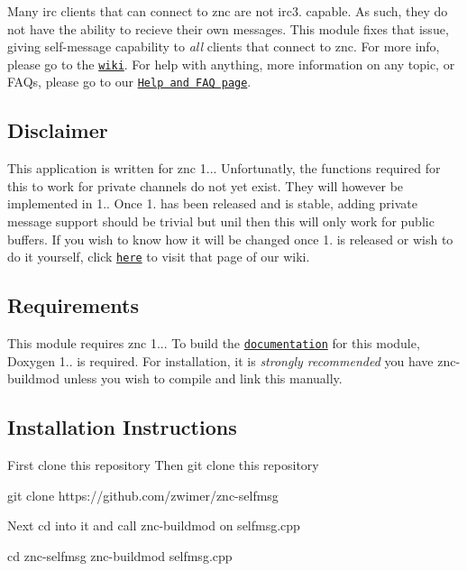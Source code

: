 Many irc clients that can connect to znc are not \textquotesingle{}irc3. capable\textquotesingle{}. As such, they do not have the ability to recieve their own messages. This module fixes that issue, giving self-\/message capability to {\itshape all} clients that connect to znc. For more info, please go to the \href{https://github.com/zwimer/znc-selfmsg/wiki}{\tt wiki}. For help with anything, more information on any topic, or F\+A\+Qs, please go to our \href{https://github.com/zwimer/znc-selfmsg/wiki/Help-and-FAQ}{\tt Help and F\+AQ page}.

\subsection*{Disclaimer}

This application is written for znc 1... Unfortunatly, the functions required for this to work for private channels do not yet exist. They will however be implemented in 1.. Once 1. has been released and is stable, adding private message support should be trivial but unil then this will only work for public buffers. If you wish to know how it will be changed once 1. is released or wish to do it yourself, click \href{https://github.com/zwimer/znc-selfmsg/wiki/Changes-for-Private-Channels}{\tt here} to visit that page of our wiki.

\subsection*{Requirements}

This module requires znc 1... To build the \href{#documentation}{\tt documentation} for this module, Doxygen 1.. is required. For installation, it is {\itshape strongly recommended} you have znc-\/buildmod unless you wish to compile and link this manually.

\subsection*{Installation Instructions}

First clone this repository Then git clone this repository 
\begin{DoxyCode}
git clone https://github.com/zwimer/znc-selfmsg
\end{DoxyCode}


Next cd into it and call znc-\/buildmod on selfmsg.\+cpp 
\begin{DoxyCode}
cd znc-selfmsg 
znc-buildmod selfmsg.cpp
\end{DoxyCode}


